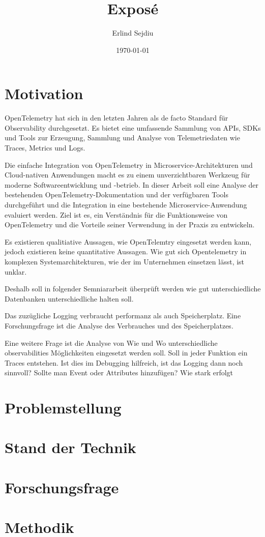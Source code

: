 \documentclass[11pt]{article}
\title{Expos\'e}
\author{Erlind Sejdiu}
\date{\today}
\begin{document}
\maketitle

\section{Motivation}

OpenTelemetry hat sich in den letzten Jahren als de facto Standard für Observability durchgesetzt. Es bietet eine umfassende Sammlung von APIs, SDKs und Tools zur Erzeugung, Sammlung und Analyse von Telemetriedaten wie Traces, Metrics und Logs.

Die einfache Integration von OpenTelemetry in Microservice-Architekturen und Cloud-nativen Anwendungen macht es zu einem unverzichtbaren Werkzeug für moderne Softwareentwicklung und -betrieb. In dieser Arbeit soll eine Analyse der bestehenden OpenTelemetry-Dokumentation und der verfügbaren Tools durchgeführt und die Integration in eine bestehende Microservice-Anwendung evaluiert werden. Ziel ist es, ein Verständnis für die Funktionsweise von OpenTelemetry und die Vorteile seiner Verwendung in der Praxis zu entwickeln.

Es existieren qualitiative Aussagen, wie OpenTelemtry eingesetzt werden kann, jedoch existieren keine quantitative Aussagen. Wie gut sich Opentelemetry in komplexen Systemarchitekturen, wie der im Unternehmen einsetzen lässt, ist unklar.

Deshalb soll in folgender Semniararbeit überprüft werden wie gut unterschiedliche Datenbanken unterschiedliche halten soll.

Das zuzügliche Logging verbraucht performanz als auch Speicherplatz. Eine Forschungsfrage ist die Analyse des Verbrauches und des Speicherplatzes.

Eine weitere Frage ist die Analyse von Wie und Wo unterschiedliche observabilities Möglichkeiten eingesetzt werden soll. Soll in jeder Funktion ein Traces entstehen. Ist dies im Debugging hilfreich, ist das Logging dann noch sinnvoll? Sollte man Event oder Attributes hinzufügen? Wie stark erfolgt

\section{Problemstellung}

\section{Stand der Technik}

\section{Forschungsfrage}

\section{Methodik}
\end{document}
